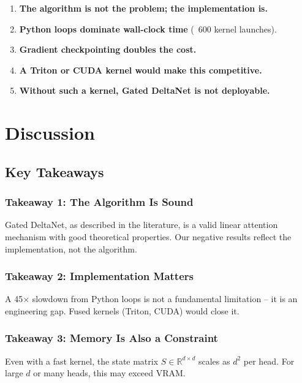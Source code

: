 \begin{enumerate}
\item \textbf{The algorithm is not the problem; the implementation is.}
\item \textbf{Python loops dominate wall-clock time} (~600 kernel launches).
\item \textbf{Gradient checkpointing doubles the cost.}
\item \textbf{A Triton or CUDA kernel would make this competitive.}
\item \textbf{Without such a kernel, Gated DeltaNet is not deployable.}

\end{enumerate}



\section{Discussion}

\subsection{Key Takeaways}

\subsubsection{Takeaway 1: The Algorithm Is Sound}

Gated DeltaNet, as described in the literature, is a valid linear attention 
mechanism with good theoretical properties. Our negative results reflect 
the implementation, not the algorithm.

\subsubsection{Takeaway 2: Implementation Matters}

A 45$\times$ slowdown from Python loops is not a fundamental limitation -- it is 
an engineering gap. Fused kernels (Triton, CUDA) would close it.

\subsubsection{Takeaway 3: Memory Is Also a Constraint}

Even with a fast kernel, the state matrix $S \in \mathbb{R}^{d \times d}$ 
scales as $d^2$ per head. For large $d$ or many heads, this may exceed 
VRAM.

